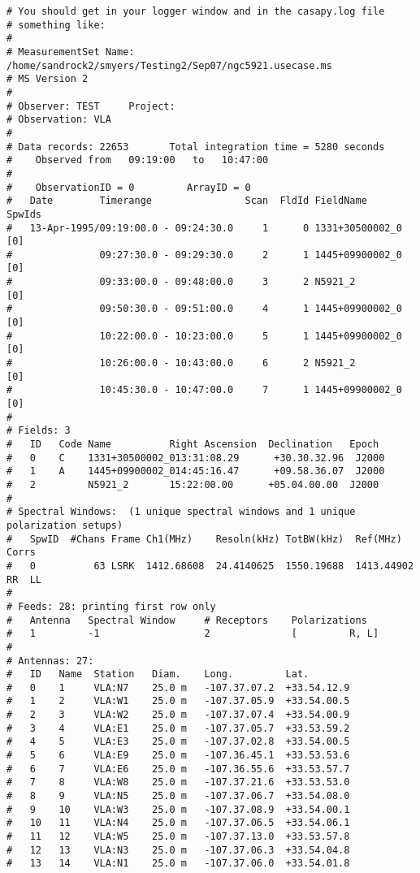 \begin{verbatim}
# You should get in your logger window and in the casapy.log file
# something like:
#
# MeasurementSet Name:  /home/sandrock2/smyers/Testing2/Sep07/ngc5921.usecase.ms
# MS Version 2
# 
# Observer: TEST     Project:   
# Observation: VLA
# 
# Data records: 22653       Total integration time = 5280 seconds
#    Observed from   09:19:00   to   10:47:00
# 
#    ObservationID = 0         ArrayID = 0
#   Date        Timerange                Scan  FldId FieldName      SpwIds
#   13-Apr-1995/09:19:00.0 - 09:24:30.0     1      0 1331+30500002_0  [0]
#               09:27:30.0 - 09:29:30.0     2      1 1445+09900002_0  [0]
#               09:33:00.0 - 09:48:00.0     3      2 N5921_2        [0]
#               09:50:30.0 - 09:51:00.0     4      1 1445+09900002_0  [0]
#               10:22:00.0 - 10:23:00.0     5      1 1445+09900002_0  [0]
#               10:26:00.0 - 10:43:00.0     6      2 N5921_2        [0]
#               10:45:30.0 - 10:47:00.0     7      1 1445+09900002_0  [0]
# 
# Fields: 3
#   ID   Code Name          Right Ascension  Declination   Epoch   
#   0    C    1331+30500002_013:31:08.29      +30.30.32.96  J2000   
#   1    A    1445+09900002_014:45:16.47      +09.58.36.07  J2000   
#   2         N5921_2       15:22:00.00      +05.04.00.00  J2000   
# 
# Spectral Windows:  (1 unique spectral windows and 1 unique polarization setups)
#   SpwID  #Chans Frame Ch1(MHz)    Resoln(kHz) TotBW(kHz)  Ref(MHz)    Corrs   
#   0          63 LSRK  1412.68608  24.4140625  1550.19688  1413.44902  RR  LL  
# 
# Feeds: 28: printing first row only
#   Antenna   Spectral Window     # Receptors    Polarizations
#   1         -1                  2              [         R, L]
# 
# Antennas: 27:
#   ID   Name  Station   Diam.    Long.         Lat.         
#   0    1     VLA:N7    25.0 m   -107.37.07.2  +33.54.12.9  
#   1    2     VLA:W1    25.0 m   -107.37.05.9  +33.54.00.5  
#   2    3     VLA:W2    25.0 m   -107.37.07.4  +33.54.00.9  
#   3    4     VLA:E1    25.0 m   -107.37.05.7  +33.53.59.2  
#   4    5     VLA:E3    25.0 m   -107.37.02.8  +33.54.00.5  
#   5    6     VLA:E9    25.0 m   -107.36.45.1  +33.53.53.6  
#   6    7     VLA:E6    25.0 m   -107.36.55.6  +33.53.57.7  
#   7    8     VLA:W8    25.0 m   -107.37.21.6  +33.53.53.0  
#   8    9     VLA:N5    25.0 m   -107.37.06.7  +33.54.08.0  
#   9    10    VLA:W3    25.0 m   -107.37.08.9  +33.54.00.1  
#   10   11    VLA:N4    25.0 m   -107.37.06.5  +33.54.06.1  
#   11   12    VLA:W5    25.0 m   -107.37.13.0  +33.53.57.8  
#   12   13    VLA:N3    25.0 m   -107.37.06.3  +33.54.04.8  
#   13   14    VLA:N1    25.0 m   -107.37.06.0  +33.54.01.8  

\end{verbatim}
